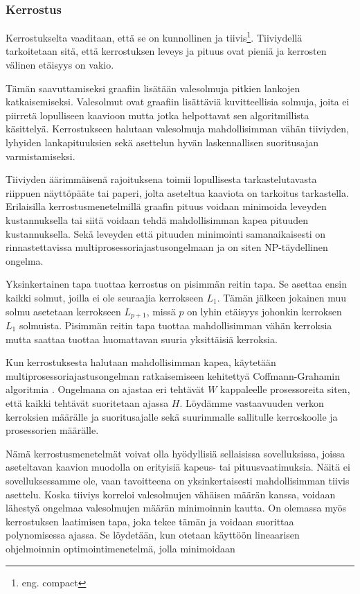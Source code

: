 \documentclass[finnish,12pt]{article}
\begin{document}
		\subsubsection{Kerrostus}

Kerrostukselta vaaditaan, että se on kunnollinen ja tiivis\footnote{eng. compact}.
Tiiviydellä tarkoitetaan sitä, että kerrostuksen leveys ja pituus ovat pieniä ja kerrosten välinen etäisyys on vakio. 

Tämän saavuttamiseksi graafiin lisätään valesolmuja pitkien lankojen katkaisemiseksi.
Valesolmut ovat graafiin lisättäviä kuvitteellisia solmuja, joita ei piirretä lopulliseen kaavioon mutta jotka helpottavat sen algoritmillista käsittelyä.
Kerrostukseen halutaan valesolmuja mahdollisimman vähän tiiviyden, lyhyiden lankapituuksien sekä asettelun hyvän laskennallisen suoritusajan varmistamiseksi.

Tiiviyden äärimmäisenä rajoituksena toimii lopullisesta tarkastelutavasta riippuen näyttöpääte tai paperi, jolta aseteltua kaaviota on tarkoitus tarkastella.
Erilaisilla kerrostusmenetelmillä graafin pituus voidaan minimoida leveyden kustannuksella tai siitä voidaan tehdä mahdollisimman kapea pituuden kustannuksella.
Sekä leveyden että pituuden minimointi samanaikaisesti on rinnastettavissa multiprosessoriajastusongelmaan ja on siten NP-täydellinen ongelma. \cite{RefWorks:39}

Yksinkertainen tapa tuottaa kerrostus on pisimmän reitin tapa.
Se asettaa ensin kaikki solmut, joilla ei ole seuraajia kerrokseen $L_1$.
Tämän jälkeen jokainen muu solmu asetetaan kerrokseen $L_{p+1}$, missä $p$ on lyhin etäisyys johonkin kerroksen $L_1$ solmuista.
Pisimmän reitin tapa tuottaa mahdollisimman vähän kerroksia mutta saattaa tuottaa huomattavan suuria yksittäisiä kerroksia.

Kun kerrostuksesta halutaan mahdollisimman kapea, käytetään multiprosessoriajastusongelman ratkaisemiseen kehitettyä Coffmann-Grahamin algoritmia \cite{RefWorks:59}.
Ongelmana on ajastaa eri tehtävät $W$ kappaleelle prosessoreita siten, että kaikki tehtävät suoritetaan ajassa $H$.
Löydämme vastaavuuden verkon kerroksien määrälle ja suoritusajalle sekä suurimmalle sallitulle kerroskoolle ja prosessorien määrälle.

Nämä kerrostusmenetelmät voivat olla hyödyllisiä sellaisissa sovelluksissa, joissa aseteltavan kaavion muodolla on erityisiä kapeus- tai pituusvaatimuksia.
Näitä ei sovelluksessamme ole, vaan tavoitteena on yksinkertaisesti mahdollisimman tiivis asettelu.
Koska tiiviys korreloi valesolmujen vähäisen määrän kanssa, voidaan lähestyä ongelmaa valesolmujen määrän minimoinnin kautta.
On olemassa myös kerrostuksen laatimisen tapa, joka tekee tämän ja voidaan suorittaa polynomisessa ajassa.
Se löydetään, kun otetaan käyttöön lineaarisen ohjelmoinnin optimointimenetelmä, jolla minimoidaan
\end{document}
